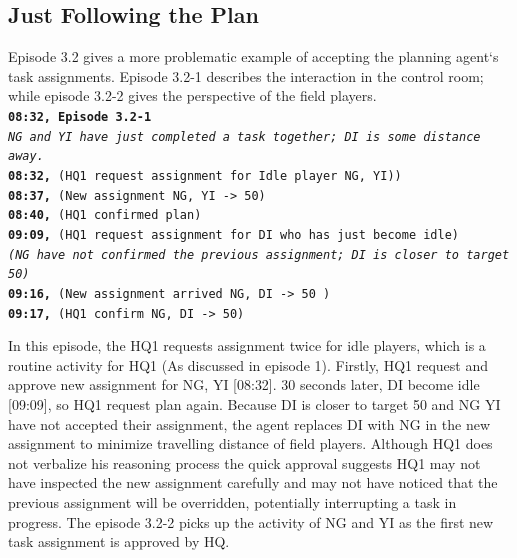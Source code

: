 \subsection{Just Following the Plan}\label{sec:study3planfollow}
Episode 3.2 gives a more problematic example of accepting the planning agent`s task assignments. Episode 3.2-1 describes the interaction in the control room; while episode 3.2-2 gives the perspective of the field players.\\

\noindent\texttt{\textbf{08:32, Episode 3.2-1}\\
\emph{NG and YI have just completed a task together; DI is some distance away.}\\
\textbf{08:32,} (HQ1 request assignment for Idle player NG, YI))\\
\textbf{08:37,} (New assignment NG, YI -> 50) \\
\textbf{08:40,} (HQ1 confirmed plan) \\
\textbf{09:09,} (HQ1 request assignment for DI who has just become idle) \\
\emph{(NG have not confirmed the previous assignment; DI is closer to target 50)}\\
\textbf{09:16,} (New assignment arrived NG, DI -> 50 )\\
\textbf{09:17,} (HQ1 confirm NG, DI -> 50)\\
}



In this episode, the HQ1 requests assignment twice for idle players, which is a routine activity for HQ1 (As discussed in episode 1). Firstly, HQ1 request and approve new assignment for NG, YI [08:32]. 30 seconds later, DI become idle [09:09], so HQ1 request plan again. Because DI is closer to target 50 and NG YI have not accepted their assignment, the agent replaces DI with NG in the new assignment to minimize travelling distance of field players. Although HQ1 does not verbalize his reasoning process the quick approval suggests HQ1 may not have inspected the new assignment carefully and may not have noticed that the previous assignment will be overridden, potentially interrupting a task in progress. The episode 3.2-2 picks up the activity of NG and YI as the first new task assignment is approved by HQ.\\

